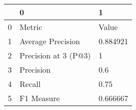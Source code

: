 \begin{tabular}{lll}
\toprule
{} &                     0 &         1 \\
\midrule
0 &                Metric &     Value \\
1 &     Average Precision &  0.884921 \\
2 &  Precision at 3 (P@3) &         1 \\
3 &             Precision &       0.6 \\
4 &                Recall &      0.75 \\
5 &            F1 Measure &  0.666667 \\
\bottomrule
\end{tabular}
